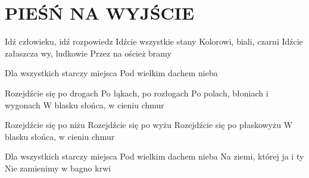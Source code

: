 \documentclass[../../../songbook.tex]{subfiles}
\begin{document}
\TabPositions{8cm} %
\section*{PIEŚŃ NA WYJŚCIE}
{}
\vspace{0.5cm}
Idź człowieku, idź rozpowiedz 	 \newline
Idźcie wszystkie stany 			 \newline
Kolorowi, biali, czarni 		 \newline
Idźcie załaszcza wy, ludkowie 	 \newline
Przez na oścież bramy 			 \newline

\-\hspace{1cm} Dla wszystkich starczy miejsca  \newline	
\-\hspace{1cm} Pod wielkim dachem nieba		 \newline

Rozejdźcie się po drogach		 \newline
Po łąkach, po rozłogach 		 \newline
Po polach, błoniach i wygonach \newline
W blasku słońca, w cieniu chmur \newline

Rozejdźcie się po niżu 			 \newline
Rozejdźcie się po wyżu \newline
Rozejdźcie się po płaskowyżu \newline
W blasku słońca, w cieniu chmur	 \newline

\-\hspace{1cm} Dla wszystkich starczy miejsca  \newline
\-\hspace{1cm} Pod wielkim dachem nieba \newline
\-\hspace{1cm} Na ziemi, której ja i ty \newline
\-\hspace{1cm} Nie zamienimy w bagno krwi \newline
\end{document}
